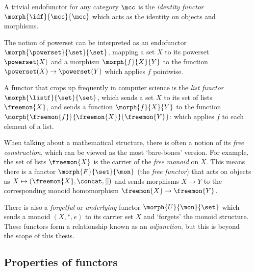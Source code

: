 \begin{example}
    A trivial endofunctor for any category \(\mcc\) is the
    \emph{identity functor} \(\morph{\idf}{\mcc}{\mcc}\) which acts as the
    identity on objects and morphisms.
\end{example}

\begin{example}
    The notion of powerset can be interpreted as an endofunctor \(
        \morph{\powerset}{\set}{\set}
    \), mapping a set \(X\) to its powerset \(\powerset(X)\) and a morphism
    \(\morph{f}{X}{Y}\) to the function \(\powerset(X) \to \powerset(Y)\) which
    applies \(f\) pointwise.
\end{example}

\begin{example}\label{ex:list-functor}
    A functor that crops up frequently in computer science is the
    \emph{list functor} \(\morph{\listf}{\set}{\set}\), which sends a set
    \(X\) to its set of lists \(\freemon{X}\), and sends a function
    \(\morph{f}{X}{Y}\) to the function
    \(\morph{\freemon{f}}{\freemon{X}}{\freemon{Y}}\): which applies \(f\)
    to each element of a list.
\end{example}

\begin{example}\label{ex:free-monoid}
    When talking about a mathematical structure, there is often a notion
    of its \emph{free construction}, which can be viewed as the most
    `bare-bones' version.
    For example, the set of lists \(\freemon{X}\) is the carrier of the
    \emph{free monoid} on \(X\).
    This means there is a functor \(\morph{F}{\set}{\mon}\) (the
    \emph{free functor}) that acts on objects as \(
        X \mapsto (\freemon{X}, \concat, [])
    \) and sends morphisms \(X \to Y\) to the corresponding monoid homomorphism
    \(\freemon{X} \to \freemon{Y}\).

    There is also a \emph{forgetful} or \emph{underlying} functor
    \(\morph{U}{\mon}{\set}\) which sends a monoid \((X, *, e)\) to its carrier
    set \(X\) and `forgets' the monoid structure.
    These functors form a relationship known as an \emph{adjunction}, but this
    is beyond the scope of this thesis.
\end{example}

\subsection{Properties of functors}

\begin{definition}

\end{definition}

\begin{definition}

\end{definition}